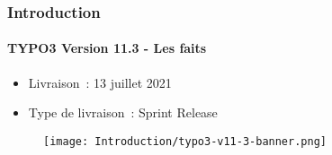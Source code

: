 %

\begin{frame}[fragile]
	\frametitle{Introduction}
	\framesubtitle{TYPO3 Version 11.3 - Les faits}

	\begin{itemize}
		\item Livraison~: 13 juillet 2021
		\item Type de livraison~: Sprint Release
	\end{itemize}

	\begin{figure}
		\texttt{[image: Introduction/typo3-v11-3-banner.png]}
	\end{figure}

\end{frame}

